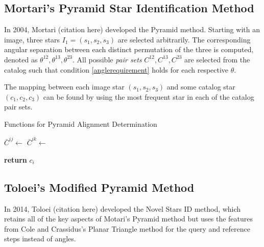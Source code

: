 \subsection{Mortari's Pyramid Star Identification Method}
In 2004, Mortari (citation here) developed the Pyramid method. Starting with an image, three stars $I_1 = (s_1, s_2, s_3)$ are selected arbitrarily. The corresponding angular separation between each distinct permutation of the three is computed, denoted as $\theta^{12}, \theta^{13}, \theta^{23}$. All possible \textit{pair sets} $C^{12}, C^{13}, C^{23}$ are selected from the catalog such that condition \eqref{anglerequirement} holds for each respective $\theta$.

The mapping between each image star $(s_1, s_2, s_3)$ and some catalog star $(c_1, c_2, c_3)$ can be found by using the most frequent star in each of the catalog pair sets. 

\begin{algorithm}[H]
\caption{Functions for Pyramid Alignment Determination} \label{Pyramid Helpers}
\begin{algorithmic}[1]
\State $\bar{C}^{ij} \gets $  
\State $\bar{C}^{ik} \gets $ 


\State \textbf{return} $c_i$
\EndFunction
\end{algorithmic}
\end{algorithm}

%
%
%

\subsection{Toloei's Modified Pyramid Method}
In 2014, Toloei (citation here) developed the Novel Stars ID method, which retains all of the key aspects of Motari's Pyramid method but uses the features from Cole and Crassidus's Planar Triangle method for the query and reference steps instead of angles.

